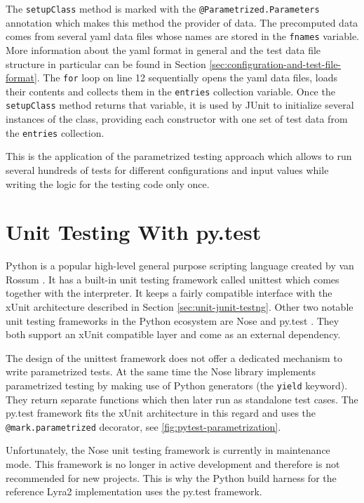 The \texttt{setupClass} method is marked with the \texttt{@Parametrized.Parameters} annotation which makes this method the provider of data. The precomputed data comes from several \gls{yaml} data files whose names are stored in the \texttt{fnames} variable. More information about the \gls{yaml} format in general and the test data file structure in particular can be found in Section \ref{sec:configuration-and-test-file-format}. The \texttt{for} loop on line 12 sequentially opens the \gls{yaml} data files, loads their contents and collects them in the \texttt{entries} collection variable. Once the \texttt{setupClass} method returns that variable, it is used by JUnit to initialize several instances of the class, providing each constructor with one set of test data from the \texttt{entries} collection.

This is the application of the parametrized testing approach which allows to run several hundreds of tests for different configurations and input values while writing the logic for the testing code only once.

\section{Unit Testing With py.test}
\label{sec:unit-pytest}

Python is a popular high-level general purpose scripting language created by van Rossum \cite{python:2017:homepage}. It has a built-in unit testing framework called unittest \cite{python:2017:unittest-homepage} which comes together with the interpreter. It keeps a fairly compatible interface with the xUnit architecture described in Section \ref{sec:unit-junit-testng}. Other two notable unit testing frameworks in the Python ecosystem are Nose \cite{nose:2017:homepage} and py.test \cite{pytest:2017:homepage}. They both support an xUnit compatible layer and come as an external dependency.

The design of the unittest framework does not offer a dedicated mechanism to write parametrized tests. At the same time the Nose library implements parametrized testing by making use of Python generators (the \texttt{yield} keyword). They return separate functions which then later run as standalone test cases. The py.test framework fits the xUnit architecture in this regard and uses the \texttt{@mark.parametrized} decorator, see \autoref{fig:pytest-parametrization}.

Unfortunately, the Nose unit testing framework is currently in maintenance mode. This framework is no longer in active development and therefore is not recommended for new projects. This is why the Python build harness for the reference Lyra2 implementation uses the py.test framework.

